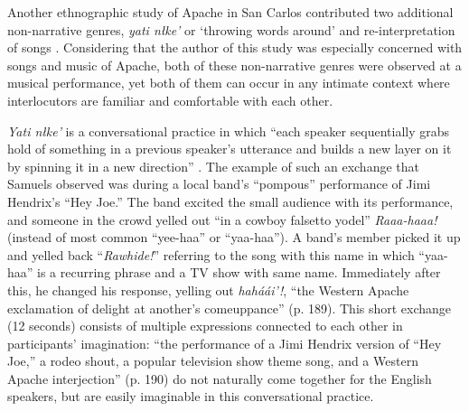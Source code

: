 \documentclass[12pt, draft]{article}
\begin{document}
Another ethnographic study of Apache in San Carlos contributed two additional non-narrative genres, \textit{yati n\l ke'} or `throwing words around' and re-interpretation of songs \parencite{samuels2004}. Considering that the author of this study was especially concerned with songs and music of Apache, both of these non-narrative genres were observed at a musical performance, yet both of them can occur in any intimate context where interlocutors are familiar and comfortable with each other. 

\textit{Yati n\l ke'} is a conversational practice in which ``each speaker sequentially grabs hold of something in a previous speaker's utterance and builds a new layer on it by spinning it in a new direction'' \textcite[p. 190]{samuels2004}. The example of such an exchange that Samuels observed was during a local band's ``pompous'' performance of Jimi Hendrix's ``Hey Joe.'' The band excited the small audience with its performance, and someone in the crowd yelled out ``in a cowboy falsetto yodel'' \textit{Raaa-haaa!} (instead of most common ``yee-haa'' or ``yaa-haa''). A band's member picked it up and yelled back ``\textit{Rawhide!}'' referring to the song with this name in which ``yaa-haa'' is a recurring phrase and a TV show with same name. Immediately after this, he changed his response, yelling out \textit{hah\'a\'ai'!}, ``the Western Apache exclamation of delight at another's comeuppance'' (p. 189). This short exchange (12 seconds) consists of multiple expressions connected to each other in participants' imagination: ``the performance of a Jimi Hendrix version of ``Hey Joe,'' a rodeo shout, a popular television show theme song, and a Western Apache interjection'' (p. 190) do not naturally come together for the English speakers, but are easily imaginable in this conversational practice. 
\end{document}
